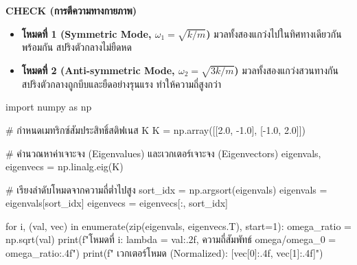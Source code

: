 \begin{mathexample}
\vspace{0.2cm}
\textbf{CHECK (การตีความทางกายภาพ)}
\begin{itemize}
    \item \textbf{โหมดที่ 1 (Symmetric Mode, $\omega_1 = \sqrt{k/m}$)} มวลทั้งสองแกว่งไปในทิศทางเดียวกันพร้อมกัน สปริงตัวกลางไม่ยืดหด
    \item \textbf{โหมดที่ 2 (Anti-symmetric Mode, $\omega_2 = \sqrt{3k/m}$)} มวลทั้งสองแกว่งสวนทางกัน สปริงตัวกลางถูกบีบและยืดอย่างรุนแรง ทำให้ความถี่สูงกว่า\qedexam
\end{itemize}

\begin{pythonbox}
import numpy as np

# กำหนดเมทริกซ์สัมประสิทธิ์สติฟเนส K
K = np.array([[2.0, -1.0],
              [-1.0, 2.0]])

# คำนวณหาค่าเจาะจง (Eigenvalues) และเวกเตอร์เจาะจง (Eigenvectors)
eigenvals, eigenvecs = np.linalg.eig(K)

# เรียงลำดับโหมดจากความถี่ต่ำไปสูง
sort_idx = np.argsort(eigenvals)
eigenvals = eigenvals[sort_idx]
eigenvecs = eigenvecs[:, sort_idx]

for i, (val, vec) in enumerate(zip(eigenvals, eigenvecs.T), start=1):
    omega_ratio = np.sqrt(val)
    print(f"โหมดที่ {i}: lambda = {val:.2f}, ความถี่สัมพัทธ์ omega/omega_0 = {omega_ratio:.4f}")
    print(f"  เวกเตอร์โหมด (Normalized): [{vec[0]:.4f}, {vec[1]:.4f}]")
\end{pythonbox}
\end{mathexample}

